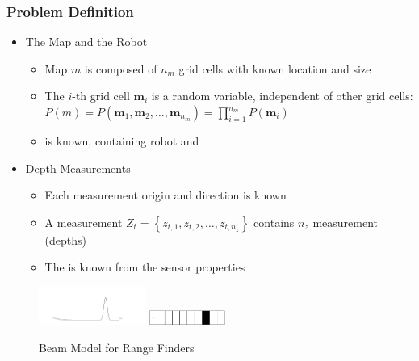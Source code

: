 \documentclass[11pt,professionalfonts,hyperref={pdftex,pdfpagemode=none,pdfstartview=FitH}]{beamer}
\newcommand{\braces}[1]{\ensuremath{\left\{ #1 \right\}}}
\renewcommand{\emph}[1]{\textit{\textbf{\color{blue}{#1}}}}
\begin{document}
\begin{frame}
\frametitle{Problem Definition}

\begin{itemize}
	\item The Map and the Robot
	\begin{itemize}
	\item Map $m$ is composed of $n_m$ grid cells with known location and size
	\item The $i$-th grid cell $\mathbf{m}_i$ is a \emph{static binary} random variable, independent of other grid cells: $P(m)=P(\mathbf{m}_1,\mathbf{m}_2,\ldots,\mathbf{m}_{n_m})=\prod_{i=1}^{n_m}P(\mathbf{m}_i)$
	\item \emph{Pose $X_t$} is known, containing robot \emph{position} and \emph{attitude}
	\end{itemize}
\vspace*{0.0cm}\pause
\end{itemize}
\begin{minipage}[t]{7.0cm}
\begin{itemize}
	\item Depth Measurements
	\begin{itemize}
	\item Each measurement origin and direction is known \emph{deterministically}
	\item A measurement \emph{scan} $Z_t=\braces{z_{t,1},z_{t,2},\ldots,z_{t,n_z}}$ contains $n_z$ measurement \emph{rays} (depths)%
\item The \emph{forward sensor model} is known from the sensor properties
\end{itemize}
\end{itemize}
\end{minipage}
\begin{minipage}[t]{3.0cm}
\hspace*{0.25cm}
\begin{figure}[!htbp]
\vspace*{-0.25cm}
\centerline{
    \includegraphics[width=3.5cm]{BeamModel.png}\hspace*{0.1cm}
    }
\vspace*{0.25cm}
\centerline{
    \includegraphics[width=2.5cm]{1D_True_Grid.png}\hspace*{0.1cm}
    }
{Beam Model for Range Finders}
\end{figure}

\end{minipage}



\end{frame}
\end{document}
